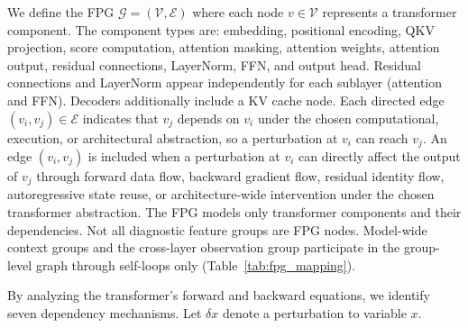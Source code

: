 We define the FPG $\mathcal{G} = (\mathcal{V}, \mathcal{E})$ where each node $v \in \mathcal{V}$ represents a transformer component. The component types are: embedding, positional encoding, QKV projection, score computation, attention masking, attention weights, attention output, residual connections, LayerNorm, FFN, and output head. Residual connections and LayerNorm appear independently for each sublayer (attention and FFN). Decoders additionally include a KV cache node. Each directed edge $(v_i, v_j) \in \mathcal{E}$ indicates that $v_j$ depends on $v_i$ under the chosen computational, execution, or architectural abstraction, so a perturbation at $v_i$ can reach $v_j$. An edge $(v_i, v_j)$ is included when a perturbation at $v_i$ can directly affect the output of $v_j$ through forward data flow, backward gradient flow, residual identity flow, autoregressive state reuse, or architecture-wide intervention under the chosen transformer abstraction. The FPG models only transformer components and their dependencies. Not all diagnostic feature groups are FPG nodes. Model-wide context groups and the cross-layer observation group participate in the group-level graph through self-loops only (Table~\ref{tab:fpg_mapping}).

By analyzing the transformer's forward and backward equations, we identify seven dependency mechanisms. Let $\delta x$ denote a perturbation to variable $x$.

